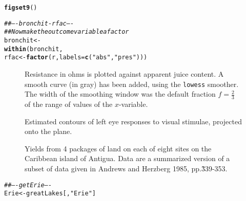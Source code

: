 \documentclass[12pt, a4paper,  BCOR=8.25mm, DIV=15]{scrartcl}\usepackage[]{graphicx}\usepackage[]{color}
\makeatletter
\newcommand{\hlstr}[1]{\textcolor[rgb]{0.192,0.494,0.8}{#1}}%
\newcommand{\hlcom}[1]{\textcolor[rgb]{0.678,0.584,0.686}{\textit{#1}}}%
\newcommand{\hlstd}[1]{\textcolor[rgb]{0.345,0.345,0.345}{#1}}%
\newcommand{\hlkwb}[1]{\textcolor[rgb]{0.69,0.353,0.396}{#1}}%
\newcommand{\hlkwc}[1]{\textcolor[rgb]{0.333,0.667,0.333}{#1}}%
\newcommand{\hlkwd}[1]{\textcolor[rgb]{0.737,0.353,0.396}{\textbf{#1}}}%
\newenvironment{kframe}{%
 \def\at@end@of@kframe{}%
 \ifinner\ifhmode%
  \def\at@end@of@kframe{\end{minipage}}%
  \begin{minipage}{\columnwidth}%
 \fi\fi%
 \def\FrameCommand##1{\hskip\@totalleftmargin \hskip-\fboxsep
 \colorbox{shadecolor}{##1}\hskip-\fboxsep
     \hskip-\linewidth \hskip-\@totalleftmargin \hskip\columnwidth}%
 \MakeFramed {\advance\hsize-\width
   \@totalleftmargin\z@ \linewidth\hsize
   \@setminipage}}%
 {\par\unskip\endMakeFramed%
 \at@end@of@kframe}
\newenvironment{knitrout}{}{} %
\newcommand{\txtt}[1]{{\texttt{#1}}}
\makeatother
\begin{document}
\begin{knitrout}
\color{fgcolor}\begin{kframe}
\begin{alltt}
\hlkwd{figset9}\hlstd{()}
\end{alltt}


{\ttfamily\noindent\itshape\color{messagecolor}{\\Attaching package: 'DAAG'}}

{\ttfamily\noindent\itshape\color{messagecolor}{The following object is masked from 'package:MASS':

\ \ \ \ hills}}\begin{alltt}
  \hlcom{## ---- bronchit-rfac ----}
\hlcom{## Now make the outcome variable a factor}
\hlstd{bronchit} \hlkwb{<-}
  \hlkwd{within}\hlstd{(bronchit,}
         \hlstd{rfac} \hlkwb{<-} \hlkwd{factor}\hlstd{(r,} \hlkwc{labels}\hlstd{=}\hlkwd{c}\hlstd{(}\hlstr{"abs"}\hlstd{,}\hlstr{"pres"}\hlstd{)))}
\end{alltt}
\end{kframe}
\end{knitrout}


\begin{figure}

  \caption{Resistance in ohms is plotted against apparent juice
    content.  A smooth curve (in gray) has been added, using the
    \txtt{lowess} smoother.  The width of the smoothing window was the
    default fraction $f = \frac{2}{3}$ of the range of values of the
    $x$-variable.}\label{fig:fruitohms}
\end{figure}

\begin{figure}

\caption{Estimated contours of left eye responses to visual stimulae,
projected onto the plane.\label{fig:visAmp}}
\end{figure}

\begin{figure}

\caption{Yields from 4 packages of land on each of eight sites on the
  Caribbean island of Antigua. Data are a summarized version of a
  subset of data given in Andrews and Herzberg 1985,
  pp.\~339-353.\label{fig:caribbean}}
\end{figure}

\begin{knitrout}
\color{fgcolor}\begin{kframe}
\begin{alltt}
\hlcom{## ---- getErie ----}
\hlstd{Erie} \hlkwb{<-} \hlstd{greatLakes[,}\hlstr{"Erie"}\hlstd{]}
\end{alltt}
\end{kframe}
\end{knitrout}
\end{document}
